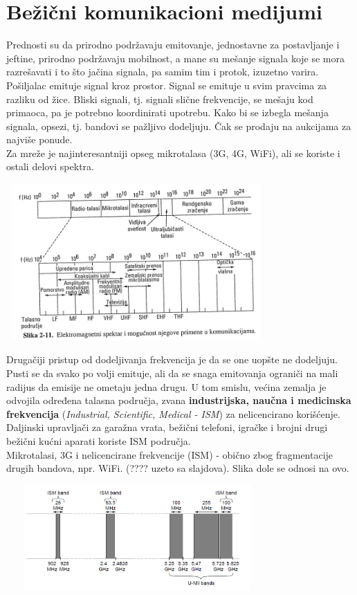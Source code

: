 \documentclass{article} %
\begin{document}
\section{Bežični komunikacioni medijumi}
Prednosti su da prirodno podržavaju emitovanje, jednostavne za postavljanje i jeftine, prirodno podržavaju mobilnost, a mane su mešanje signala koje se mora razrešavati i to što jačina signala, pa samim tim i protok, izuzetno varira.\\
Pošiljalac emituje signal kroz prostor. Signal se emituje u svim pravcima za razliku od žice. Bliski signali, tj. signali slične frekvencije, se mešaju kod primaoca, pa je potrebno koordinirati upotrebu. Kako bi se izbegla mešanja signala, opsezi, tj. bandovi se pažljivo dodeljuju. Čak se prodaju na aukcijama za najviše ponude.\\
Za mreže je najinteresantniji opseg mikrotalasa (3G, 4G, WiFi), ali se koriste i ostali delovi spektra.\\
\begin{center}
\includegraphics[width=10cm, height=6cm]{eltalasi}\\
\end{center} 
Drugačiji pristup od dodeljivanja frekvencija je da se one uopšte ne dodeljuju. Pusti se da svako po volji emituje, ali da se snaga emitovanja ograniči na mali radijus da emisije ne ometaju jedna drugu. U tom smislu, većina zemalja je odvojila određena talasna područja, zvana \textbf{industrijska, naučna i medicinska frekvencija} (\textit{Industrial, Scientific, Medical - ISM}) za nelicencirano korišćenje. Daljinski upravljači za garažna vrata, bežični telefoni, igračke i brojni drugi bežični kućni aparati koriste ISM područja.\\
Mikrotalasi, 3G i nelicencirane frekvencije (ISM) - obično zbog fragmentacije drugih bandova, npr. WiFi. (???? uzeto sa slajdova). Slika dole se odnosi na ovo.
\begin{center}
\includegraphics[width=10cm, height=4cm]{stagod}\\
\end{center} 
\end{document}
